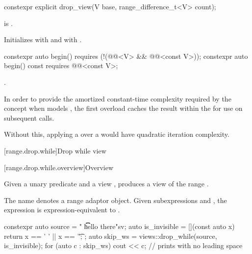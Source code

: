 %
\begin{itemdecl}
constexpr explicit drop_view(V base, range_difference_t<V> count);
\end{itemdecl}

\begin{itemdescr}
\pnum
\expects
{} is .

\pnum
\effects
Initializes  with  and
 with .
\end{itemdescr}

%
\begin{itemdecl}
constexpr auto begin()
  requires (!(@@<V> && @@<const V>));
constexpr auto begin() const requires @@<const V>;
\end{itemdecl}

\begin{itemdescr}
\pnum
\returns
{}.

\pnum
\remarks
In order to provide the amortized constant-time complexity required
by the  concept
when  models ,
the first overload caches the result within the 
for use on subsequent calls.
\begin{note}
Without this,
applying a  over a 
would have quadratic iteration complexity.
\end{note}
\end{itemdescr}

[range.drop.while]{Drop while view}

[range.drop.while.overview]{Overview}

\pnum
Given a unary predicate  and a view ,
 produces a view
of the range .

\pnum
{}%
The name 
denotes a range adaptor object.
Given subexpressions  and ,
the expression 
is expression-equivalent to .

\pnum
\begin{example}
\begin{codeblock}
constexpr auto source = "  \t   \t   \t   hello there"sv;
auto is_invisible = [](const auto x) { return x == ' ' || x == '\t'; };
auto skip_ws = views::drop_while(source, is_invisible);
for (auto c : skip_ws) {
  cout << c;                                    // prints  with no leading space
}
\end{codeblock}
\end{example}

